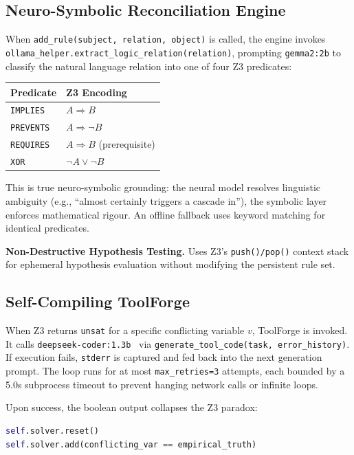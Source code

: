 \documentclass[sigconf]{acmart}
\begin{document}
\subsection{Neuro-Symbolic Reconciliation Engine}

When \texttt{add\_rule(subject, relation, object)} is called, the engine invokes \texttt{ollama\_helper.extract\_logic\_relation(relation)}, prompting \texttt{gemma2:2b} to classify the natural language relation into one of four Z3 predicates:

\begin{center}
\begin{tabular}{ll}
\toprule
\textbf{Predicate} & \textbf{Z3 Encoding} \\
\midrule
\texttt{IMPLIES}  & $A \Rightarrow B$ \\
\texttt{PREVENTS} & $A \Rightarrow \neg B$ \\
\texttt{REQUIRES} & $A \Rightarrow B$ (prerequisite) \\
\texttt{XOR}      & $\neg A \vee \neg B$ \\
\bottomrule
\end{tabular}
\end{center}

This is true neuro-symbolic grounding: the neural model resolves linguistic ambiguity (e.g., ``almost certainly triggers a cascade in''), the symbolic layer enforces mathematical rigour. An offline fallback uses keyword matching for identical predicates.

\textbf{Non-Destructive Hypothesis Testing.} Uses Z3's \texttt{push()/pop()} context stack for ephemeral hypothesis evaluation without modifying the persistent rule set.

\subsection{Self-Compiling ToolForge}

When Z3 returns \texttt{unsat} for a specific conflicting variable $v$, ToolForge is invoked. It calls \texttt{deepseek-coder:1.3b}~\cite{deepseek_coder} via \texttt{generate\_tool\_code(task, error\_history)}. If execution fails, \texttt{stderr} is captured and fed back into the next generation prompt. The loop runs for at most \texttt{max\_retries=3} attempts, each bounded by a 5.0s subprocess timeout to prevent hanging network calls or infinite loops.

Upon success, the boolean output collapses the Z3 paradox:
\begin{lstlisting}[language=Python, caption={Paradox collapse after empirical resolution}]
self.solver.reset()
self.solver.add(conflicting_var == empirical_truth)
\end{lstlisting}
\end{document}
